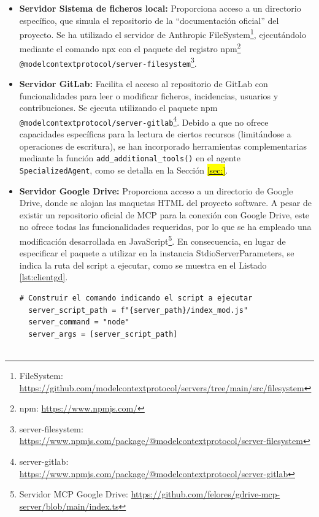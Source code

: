 \begin{itemize}
  \item\textbf{Servidor Sistema de ficheros local: }Proporciona acceso a un directorio específico, que simula el repositorio de la ``documentación oficial'' del proyecto. Se ha utilizado el servidor de Anthropic FileSystem\footnote{FileSystem: \url{https://github.com/modelcontextprotocol/servers/tree/main/src/filesystem}}, ejecutándolo mediante el comando npx con el paquete del registro npm\footnote{npm: \url{https://www.npmjs.com/}} \texttt{@modelcontextprotocol/server-filesystem}\footnote{server-filesystem: \url{https://www.npmjs.com/package/@modelcontextprotocol/server-filesystem}}.

  \item\textbf{Servidor GitLab: }Facilita el acceso al repositorio de GitLab con funcionalidades para leer o modificar ficheros, incidencias, usuarios y contribuciones. Se ejecuta utilizando el paquete npm \texttt{@modelcontextprotocol/server-gitlab}\footnote{server-gitlab: \url{https://www.npmjs.com/package/@modelcontextprotocol/server-gitlab}}. Debido a que no ofrece capacidades específicas para la lectura de ciertos recursos (limitándose a operaciones de escritura), se han incorporado herramientas complementarias mediante la función \texttt{add\_additional\_tools()} en el agente \texttt{SpecializedAgent}, como se detalla en la Sección \colorbox{yellow}{\ref{sec:}}.

  \item\textbf{Servidor Google Drive: }Proporciona acceso a un directorio de Google Drive, donde se alojan las maquetas HTML del proyecto software. A pesar de existir un repositorio oficial de MCP para la conexión con Google Drive, este no ofrece todas las funcionalidades requeridas, por lo que se ha empleado una modificación desarrollada en JavaScript\footnote{Servidor MCP Google Drive: \url{https://github.com/felores/gdrive-mcp-server/blob/main/index.ts}}. En consecuencia, en lugar de especificar el paquete a utilizar en la instancia StdioServerParameters, se indica la ruta del script a ejecutar, como se muestra en el Listado \ref{lst:clientgd}.

\begin{lstlisting}[caption={mcp\_multi\_client.py: StdioServerParameters para el servidor MCP de Google Drive},label={lst:clientgd}]
  # Construir el comando indicando el script a ejecutar
  server_script_path = f"{server_path}/index_mod.js"
  server_command = "node"
  server_args = [server_script_path]


\end{lstlisting}
\end{itemize}
